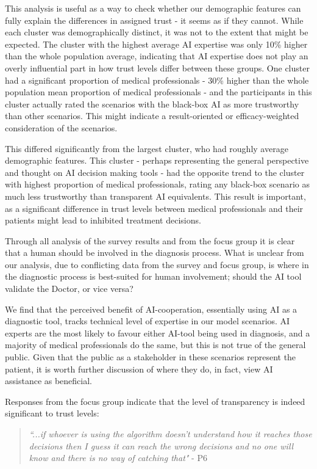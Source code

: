 \documentclass[manuscript,screen,review]{acmart}
\begin{document}
This analysis is useful as a way to check whether our demographic features can fully explain the differences in assigned trust - it seems as if they cannot. While each cluster was demographically distinct, it was not to the extent that might be expected. The cluster with the highest average AI expertise was only 10\% higher than the whole population average, indicating that AI expertise does not play an overly influential part in how trust levels differ between these groups. One cluster had a significant proportion of medical professionals - 30\% higher than the whole population mean proportion of medical professionals - and the participants in this cluster actually rated the scenarios with the black-box AI as more trustworthy than other scenarios. This might indicate a result-oriented or efficacy-weighted consideration of the scenarios.

This differed significantly from the largest cluster, who had roughly average demographic features. This cluster - perhaps representing the general perspective and thought on AI decision making tools - had the opposite trend to the cluster with highest proportion of medical professionals, rating any black-box scenario as much less trustworthy than transparent AI equivalents. This result is important, as a significant difference in trust levels between medical professionals and their patients might lead to inhibited treatment decisions.

Through all analysis of the survey results and from the focus group it is clear that a human should be involved in the diagnosis process. What is unclear from our analysis, due to conflicting data from the survey and focus group, is where in the diagnostic process is best-suited for human involvement; should the AI tool validate the Doctor, or vice versa?

We find that the perceived benefit of AI-cooperation, essentially using AI as a diagnostic tool, tracks technical level of expertise in our model scenarios. AI experts are the most likely to favour either AI-tool being used in diagnosis, and a majority of medical professionals do the same, but this is not true of the general public. Given that the public as a stakeholder in these scenarios represent the patient, it is worth further discussion of where they do, in fact, view AI assistance as beneficial.

Responses from the focus group indicate that the level of transparency is indeed significant to trust levels:

\begin{quote}
    \textit{``...if whoever is using the algorithm doesn't understand how it reaches those decisions then I guess it can reach the wrong decisions and no one will know and there is no way of catching that"} - P6
\end{quote}
\end{document}
